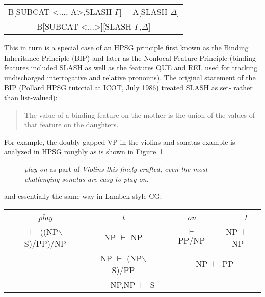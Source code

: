 \documentclass[output=paper]{langsci/langscibook}
\begin{document}
\begin{center}
\begin{tabular}{c}
B[SUBCAT <..., A>,SLASH $\Gamma$] \ \ A[SLASH $\Delta$] \\ \cline{1-1}
B[SUBCAT <...>][SLASH $\Gamma$,$\Delta$]
\end{tabular}
\end{center}

This in turn is a special case of an HPSG principle first known as the Binding Inheritance Principle (BIP) and later as the Nonlocal Feature Principle (binding features included SLASH as well as the features QUE
and REL used for tracking undischarged interrogative and relative pronouns). The original statement of the BIP (Pollard HPSG tutorial at ICOT, July 1986) treated SLASH as set- rather than list-valued):

\begin{quote}
The value of a binding feature on the mother is the union of the values of that feature on the daughters.
\end{quote}

\noindent
For example, the doubly-gapped VP in the violins-and-sonatas example is analyzed in HPSG roughly  as
is shown in Figure~\ref{fig-play-on}
\begin{figure}
\caption{\label{fig-play-on}\emph{play on} as part of \emph{Violins this finely crafted, even the most challenging sonatas are easy to play on.}}
\end{figure}
and essentially the same way in Lambek-style CG:

\begin{center}
\begin{tabular}{ccccccc}
\multicolumn{2}{c}{\em play} & {\em t} & & {\em on} & \ \ \ \ \ \ {\em t} & \\
\multicolumn{2}{c}{$\vdash$ ((NP$\backslash$S)/PP)/NP} & NP $\vdash$ NP & & $\vdash$ PP/NP & \multicolumn{2}{c}{NP $\vdash$ NP} \\ \cline{1-3} \cline{5-7}
 & \multicolumn{2}{c}{NP $\vdash$ (NP$\backslash$S)/PP} & & \multicolumn{3}{c}{NP $\vdash$ PP} \\ \cline{2-6}
\multicolumn{7}{c}{NP,NP $\vdash$ S}
\end{tabular}
\end{center}
\end{document}
